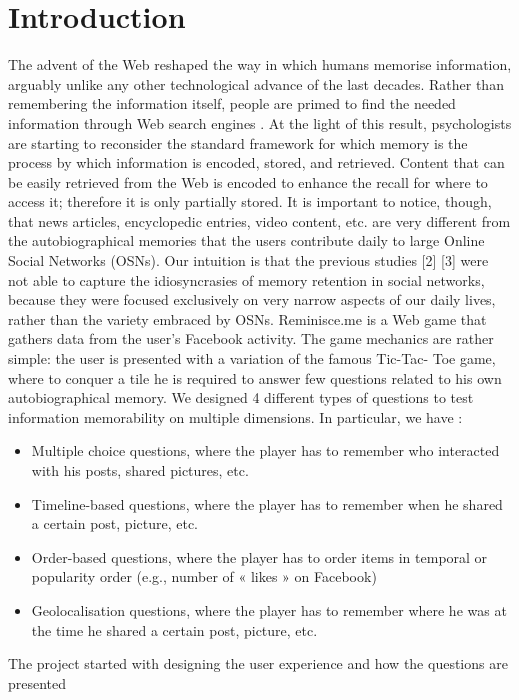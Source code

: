 \chapter*{Introduction}
The advent of the Web reshaped the way in which humans memorise information, arguably
unlike any other technological advance of the last decades. Rather than remembering the
information itself, people are primed to find the needed information through Web search
engines \cite{googlemem} . At the light of this result, psychologists are starting to reconsider the standard
framework for which memory is the process by which information is encoded, stored, and
retrieved. Content that can be easily retrieved from the Web is encoded to enhance the recall
for where to access it; therefore it is only partially stored.
It is important to notice, though, that news articles, encyclopedic entries, video content, etc.
are very different from the autobiographical memories that the users contribute daily to large
Online Social Networks (OSNs). Our intuition is that the previous studies [2] [3] were not
able to capture the idiosyncrasies of memory retention in social networks, because they were
focused exclusively on very narrow aspects of our daily lives, rather than the variety embraced
by OSNs.
Reminisce.me is a Web game that gathers data from the user’s Facebook activity. The game
mechanics are rather simple: the user is presented with a variation of the famous Tic-Tac-
Toe game, where to conquer a tile he is required to answer few questions related to his own
autobiographical memory.
We designed 4 different types of questions to test information memorability on multiple
dimensions. In particular, we have :
\begin{itemize}
	\item Multiple choice questions, where the player has to remember who interacted with his posts, shared pictures, etc.
	\item Timeline-based questions, where the player has to remember when he shared a certain post, picture, etc.
	\item Order-based questions, where the player has to order items in temporal or popularity order (e.g., number of « likes » on Facebook)
	\item Geolocalisation questions, where the player has to remember where he was at the time he shared a certain post, picture, etc.
\end{itemize}
The project started with designing the user experience and how the questions are presented
